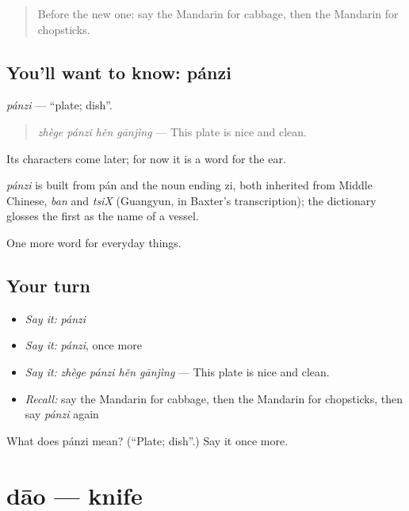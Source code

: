 \begin{quote}
Before the new one: say the Mandarin for cabbage, then the Mandarin for chopsticks.
\end{quote}

\subsection*{You'll want to know: pánzi}
\emph{pánzi} — \textquotedblleft{}plate; dish\textquotedblright{}.

\begin{quote}
\emph{zhège pánzi hěn gānjìng} — This plate is nice and clean.
\end{quote}

Its characters come later; for now it is a word for the ear.

\begin{cousinweb}
\emph{pánzi} is built from pán and the noun ending zi, both inherited from Middle Chinese, \emph{ban} and \emph{tsiX} (Guangyun, in Baxter's transcription); the dictionary glosses the first as the name of a vessel.
\end{cousinweb}

\begin{grammarlens}[title={What you've built}]
One more word for everyday things.
\end{grammarlens}

\subsection*{Your turn}
\begin{itemize}
\raggedright
  \item \emph{Say it:} \emph{pánzi}
  \item \emph{Say it:} \emph{pánzi}, once more
  \item \emph{Say it:} \emph{zhège pánzi hěn gānjìng} — This plate is nice and clean.
  \item \emph{Recall:} say the Mandarin for cabbage, then the Mandarin for chopsticks, then say \emph{pánzi} again
\end{itemize}

\begin{tcolorbox}[breakable,colback=teal!4,colframe=teal!35!black,title={Before you move on}]
What does pánzi mean? (\textquotedblleft{}Plate; dish\textquotedblright{}.) Say it once more.
\end{tcolorbox}
\section[dāo]{dāo — knife}

